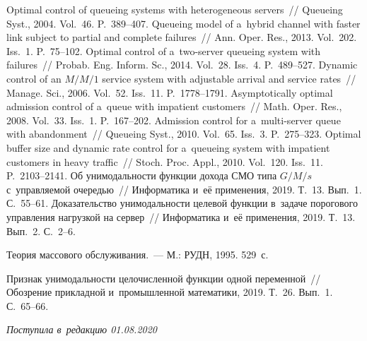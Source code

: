 \begin{multicols}{2}
{{\begin{thebibliography}{99}
 Optimal control of queueing systems with
heterogeneous servers~// Queueing Syst., 2004. Vol.~46. P.~389--407.
 Queueing model of a~hybrid channel with faster link subject to
partial and complete failures~// Ann. Oper. Res., 2013. Vol.~202. Iss.~1. P.~75--102.
 Optimal control of a~two-server
queueing system with failures~// Probab. Eng. Inform. Sc.,
2014. Vol.~28. Iss.~4. P.~489--527.
 Dynamic control of an $M/M/1$ service system with
adjustable arrival and service rates~// Manage. Sci., 2006. Vol.~52. Iss.~11.
P.~1778--1791.
 Asymptotically optimal admission control of a~queue with
impatient customers~// Math. Oper. Res., 2008. Vol.~33. Iss.~1. P.~167--202.
 Admission control for a~multi-server queue with
abandonment~// Queueing Syst., 2010. Vol.~65. Iss.~3. P.~275--323.
 Optimal buffer size and dynamic rate control
for a~queueing system with impatient customers in heavy traffic~// Stoch. Proc.
Appl., 2010. Vol.~120. Iss.~11. P.~2103--2141.
 Об унимодальности функции дохода СМО
типа $G/M/s$ с~управляемой очередью~// Информатика и~её применения, 2019.
Т.~13. Вып.~1. С.~55--61.
 Доказательство унимодальности
целевой функции в~задаче порогового управления нагрузкой на сервер~//
Информатика и~её применения, 2019. Т.~13. Вып.~2. С.~2--6.

 Теория массового обслуживания.~--- М.:
РУДН, 1995. 529~с.

 Признак унимодальности целочисленной функции одной
переменной~// Обозрение прикладной и~промышленной математики, 2019.
Т.~26. Вып.~1. С.~65--66.

\end{thebibliography}

}
}

\end{multicols}

\vspace*{-3pt}

\hfill{\small\textit{Поступила в~редакцию 01.08.2020}}

\vspace*{8pt}

